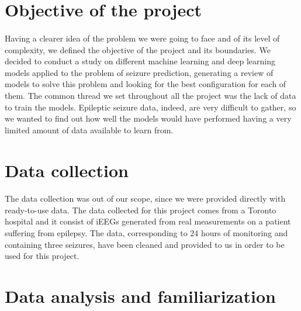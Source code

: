 
\section{Objective of the project} \label{sec: objective_project}
\paragraph{} Having a clearer idea of the problem we were going to face and of its level of complexity, we defined the objective of the project and its boundaries. We decided to conduct a study on different machine learning and deep learning models applied to the problem of seizure prediction, generating a review of models to solve this problem and looking for the best configuration for each of them. The common thread we set throughout all the project was the lack of data to train the models. Epileptic seizure data, indeed, are very difficult to gather, so we wanted to find out how well the models would have performed having a very limited amount of data available to learn from.


\section{Data collection} \label{sec: data_collection}
\paragraph{} The data collection was out of our scope, since we were provided directly with ready-to-use data. The data collected for this project comes from a Toronto hospital and it consist of iEEGs generated from real measurements on a patient suffering from epilepsy. The data, corresponding to 24 hours of monitoring and containing three seizures, have been cleaned and provided to us in order to be used for this project.


\section{Data analysis and familiarization} \label{sec: data_analysis_familiarization}
